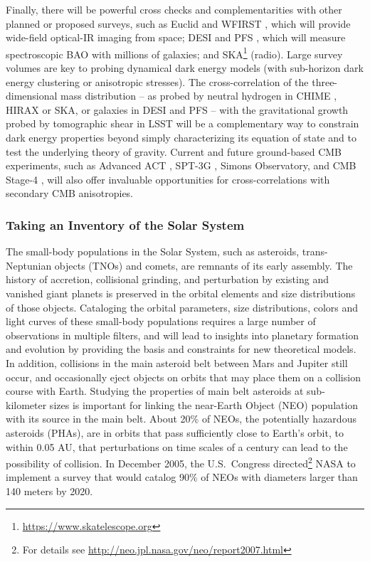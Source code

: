 Finally, there will be powerful cross checks and complementarities with other planned or
proposed surveys, such as Euclid \citep{2011arXiv1110.3193L} and WFIRST
\citep{2015arXiv150303757S}, which will provide
wide-field optical-IR imaging from space;
DESI \citep{2013arXiv1308.0847L}
and PFS \citep{2014PASJ...66R...1T}, which will measure
spectroscopic BAO with
millions of galaxies; and SKA\footnote{\url{https://www.skatelescope.org}} (radio).
Large survey volumes are key to probing dynamical dark energy models (with sub-horizon
dark energy clustering or anisotropic stresses). The cross-correlation
of the three-dimensional
mass distribution -- as probed by neutral hydrogen in CHIME \citep{2014SPIE.9145E..4VN}, HIRAX \citep{2016SPIE.9906E..5XN}
or SKA, or galaxies in DESI and PFS -- with the gravitational growth
probed by tomographic shear in LSST will be a complementary way to constrain dark energy
properties beyond simply characterizing its equation of state and to test the underlying theory of gravity.
Current and future ground-based CMB experiments, such as Advanced ACT \citep{2016SPIE.9910E..14D},
SPT-3G \citep{2014SPIE.9153E..1PB}, Simons Observatory, and CMB Stage-4 \citep{2016arXiv161002743A}, will also offer invaluable opportunities for
cross-correlations with secondary CMB anisotropies.



\subsubsection{Taking an Inventory of the Solar System}


The small-body populations in the Solar System, such as asteroids, trans-Neptunian objects (TNOs)
and comets, are remnants of its early assembly. The history of accretion, collisional grinding, and
perturbation by existing and vanished giant planets is preserved in the orbital elements and size
distributions of those objects. Cataloging the orbital parameters, size distributions, colors and light
curves of these small-body populations requires a large number of observations in multiple filters,
and will lead to insights into planetary formation and evolution by providing the basis and constraints
for new theoretical models. In addition, collisions in the main asteroid belt between Mars and Jupiter
still occur, and occasionally eject objects on orbits that may place them on a collision course with Earth.
Studying the properties of main belt asteroids at sub-kilometer sizes is important for linking the near-Earth
Object (NEO) population with its source in the main belt. About 20\% of NEOs, the potentially hazardous
asteroids (PHAs), are in orbits that pass sufficiently close to Earth's orbit, to within 0.05 AU, that perturbations
on time scales of a century can lead to the possibility of collision. In December 2005,
the U.S.\ Congress directed\footnote{For details see \url{http://neo.jpl.nasa.gov/neo/report2007.html}} NASA to
implement a survey that would catalog 90\% of NEOs with diameters larger than 140 meters by 2020.

